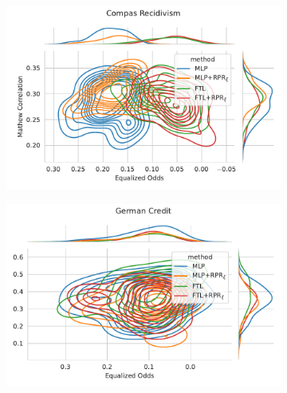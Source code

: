 \begin{figure}
\begin{subfigure}{.45\linewidth}
    \includegraphics[width=1\linewidth]{images/pareto_mcc_odds_compas_rpr.pdf}
\end{subfigure}
\begin{subfigure}{.45\linewidth}
    \includegraphics[width=1\linewidth]{images/pareto_mcc_odds_german_rpr.pdf}
\end{subfigure}
\end{figure}

